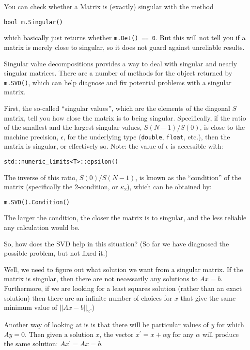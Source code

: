 \documentclass[twoside,letterpaper,11pt]{article}
\renewcommand{\tt}[1]{{\texttt {#1}}}
\begin{document}
You can check whether a Matrix is (exactly) singular with 
the method
\begin{verbatim}
bool m.Singular()
\end{verbatim}
which basically just returns whether \tt{m.Det() == 0}.  But this will not
tell you if a matrix is merely close to singular, so it does not guard 
against unreliable results.

Singular value decompositions provides a way to deal with 
singular and nearly singular matrices.  There are a number of methods for the 
object returned by \tt{m.SVD()}, which can help diagnose and fix 
potential problems with a singular matrix.

First, the so-called ``singular values'', which are the elements of the
diagonal $S$ matrix, tell you how close the matrix is to being singular.
Specifically, if the ratio of the smallest and the largest singular values,
$S(N-1)/S(0)$, is close to the machine precision, $\epsilon$, for the 
underlying type (\tt{double}, \tt{float}, etc.),
then the matrix is singular, or effectively so.
Note: the value of $\epsilon$ is accessible with:
\begin{verbatim}
std::numeric_limits<T>::epsilon()
\end{verbatim}

The inverse of this ratio, $S(0)/S(N-1)$, is known as the ``condition'' of the matrix
(specifically the 2-condition, or $\kappa_2$), which can be obtained by:
\begin{verbatim}
m.SVD().Condition()
\end{verbatim}
The larger the condition, the closer the matrix is to singular, and the
less reliable any calculation would be.

So, how does the SVD help in this situation?  (So far we have diagnosed
the possible problem, but not fixed it.)

Well, we need to figure out what solution we want from a singular matrix.
If the matrix is singular, then there are not necessarily any solutions
to $A x = b$.  Furthermore, if we are looking for a least squares solution 
(rather than an exact solution) then there are an infinite number of choices for 
$x$ that give the same minimum value of $||A x-b||_2$.)

Another way of looking at is is that there will be particular values of $y$ 
for which $A y = 0$.
Then given a solution $x$, the vector $x^\prime = x + \alpha y$ for any $\alpha$
will produce 
the same solution: $A x^\prime = A x = b$.
\end{document}
